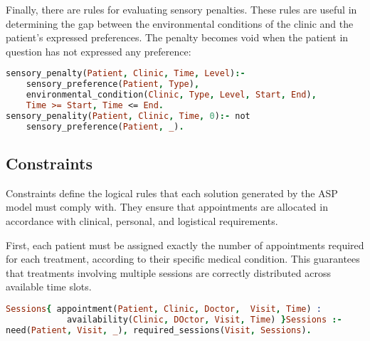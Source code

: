 \documentclass{tlp}
\begin{document}
Finally, there are rules for evaluating sensory penalties. These rules are useful in determining the gap between the environmental conditions of the clinic and the patient’s expressed preferences. The penalty becomes void when the patient in question has not expressed any preference:
\begin{lstlisting}[language=Prolog, caption=Sensory Penalty Based on Environmental Conditions]
sensory_penalty(Patient, Clinic, Time, Level):-
    sensory_preference(Patient, Type),
    environmental_condition(Clinic, Type, Level, Start, End),
    Time >= Start, Time <= End.
sensory_penality(Patient, Clinic, Time, 0):- not
    sensory_preference(Patient, _).
\end{lstlisting}




\vspace{-0.35cm}
\subsection{Constraints}

Constraints define the logical rules that each solution generated by the ASP model must comply with. They ensure that appointments are allocated in accordance with clinical, personal, and logistical requirements. 

First, each patient must be assigned exactly the number of appointments required for each treatment, according to their specific medical condition. This guarantees that treatments involving multiple sessions are correctly distributed across available time slots.

\begin{lstlisting}[language=Prolog, caption=Choice Rule for Appointment Allocation Based on Patient Needs]
Sessions{ appointment(Patient, Clinic, Doctor,  Visit, Time) : 
            availability(Clinic, DOctor, Visit, Time) }Sessions :- 
need(Patient, Visit, _), required_sessions(Visit, Sessions).
\end{lstlisting}
\end{document}
